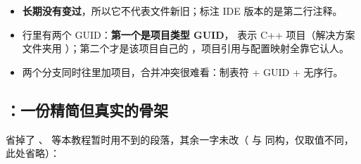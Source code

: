 \begin{itemize}
  \item \textbf{ 长期没有变过}，所以它不代表文件新旧；标注 IDE 版本的是第二行注释。
  \item {} 行里有两个 GUID：\textbf{第一个是项目类型 GUID}，\allowbreak{} 表示 C++ 项目（解决方案文件夹用 \allowbreak{}）；第二个才是该项目自己的 ，项目引用与配置映射全靠它认人。
  \item 两个分支同时往里加项目，合并冲突很难看：制表符 + GUID + 无序行。
\end{itemize}

\subsection{：一份精简但真实的骨架}

省掉了 、 等本教程暂时用不到的段落，其余一字未改（ 与  同构，仅取值不同，此处省略）：

